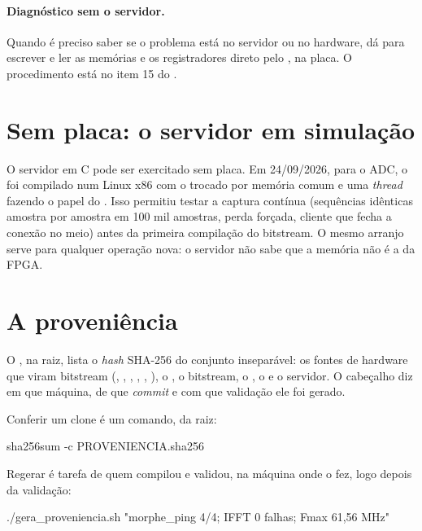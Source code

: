 \paragraph{Diagnóstico sem o servidor.} Quando é preciso saber se o problema
está no servidor ou no hardware, dá para escrever e ler as memórias e os
registradores direto pelo , na placa. O procedimento está no item
15 do .

\section{Sem placa: o servidor em simulação}

O servidor em C pode ser exercitado sem placa. Em 24/09/2026, para o ADC, o
 foi compilado num Linux x86 com o  trocado
por memória comum e uma \emph{thread} fazendo o papel do . Isso
permitiu testar a captura contínua (sequências idênticas amostra por amostra em
100 mil amostras, perda forçada, cliente que fecha a conexão no meio) antes da
primeira compilação do bitstream. O mesmo arranjo serve para qualquer operação
nova: o servidor não sabe que a memória não é a da FPGA.

\section{A proveniência}
\label{sec:proveniencia}

O , na raiz, lista o \emph{hash} SHA-256 do conjunto
inseparável: os fontes de hardware que viram bitstream (,
, , , ,
), o , o bitstream, o , o
 e o servidor. O cabeçalho diz em que máquina, de que
\emph{commit} e com que validação ele foi gerado.

Conferir um clone é um comando, da raiz:

\begin{center}
\ttfamily sha256sum -c PROVENIENCIA.sha256
\end{center}

Regerar é tarefa de quem compilou e validou, na máquina onde o fez, logo depois
da validação:

\begin{center}
\ttfamily ./gera\_proveniencia.sh "morphe\_ping 4/4; IFFT 0 falhas; Fmax 61,56 MHz"
\end{center}

